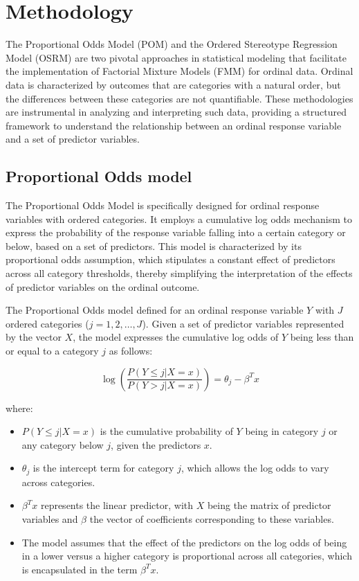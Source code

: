 \documentclass{article}
\begin{document}
\section{Methodology}

The Proportional Odds Model (POM) and the Ordered Stereotype Regression Model (OSRM) are two pivotal approaches in statistical modeling that facilitate the implementation of Factorial Mixture Models (FMM) for ordinal data. Ordinal data is characterized by outcomes that are categories with a natural order, but the differences between these categories are not quantifiable. These methodologies are instrumental in analyzing and interpreting such data, providing a structured framework to understand the relationship between an ordinal response variable and a set of predictor variables.

\subsection{Proportional Odds model}

The Proportional Odds Model is specifically designed for ordinal response variables with ordered categories. It employs a cumulative log odds mechanism to express the probability of the response variable falling into a certain category or below, based on a set of predictors. This model is characterized by its proportional odds assumption, which stipulates a constant effect of predictors across all category thresholds, thereby simplifying the interpretation of the effects of predictor variables on the ordinal outcome.

The Proportional Odds model defined for an ordinal response variable $Y$ with $J$ ordered categories ($j=1, 2, \ldots, J$). 
Given a set of predictor variables represented by the vector $X$, the model expresses the cumulative log odds of $Y$ being less than or equal to a category $j$ as follows:

\[
\log\left(\frac{P(Y \leq j | X = x)}{P(Y > j | X = x)}\right) = \theta_j - \beta^T x
\]

where:
\begin{itemize}
    \item $P(Y \leq j | X = x)$ is the cumulative probability of $Y$ being in category $j$ or any category below $j$, given the predictors $x$.
    \item $\theta_j$ is the intercept term for category $j$, which allows the log odds to vary across categories.
    \item $\beta^T x$ represents the linear predictor, with $X$ being the matrix of predictor variables and $\beta$ the vector of coefficients corresponding to these variables.
    \item The model assumes that the effect of the predictors on the log odds of being in a lower versus a higher category is proportional across all categories, which is encapsulated in the term $\beta^T x$.
\end{itemize}
\end{document}
